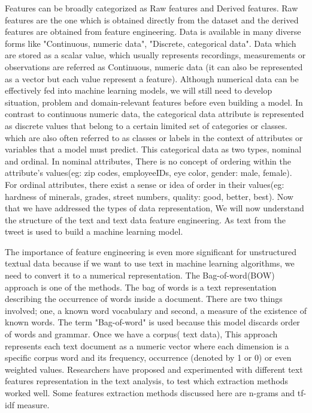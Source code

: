 Features can be broadly categorized as Raw features and Derived features. Raw features are the one which is obtained directly from the dataset and the derived features are obtained from feature engineering. Data is available in many diverse forms like "Continuous, numeric data", "Discrete, categorical data". Data which are stored as a scalar value, which usually represents recordings, measurements or observations are referred as Continuous, numeric data (it can also be represented as a vector but each value represent a feature). Although numerical data can be effectively fed into machine learning models, we will still need to develop situation, problem and domain-relevant features before even building a model. In contrast to continuous numeric data, the categorical data attribute is represented as discrete values that belong to a certain limited set of categories or classes. which are also often referred to as classes or labels in the context of attributes or variables that a model must predict. This categorical data as two types, nominal and ordinal. In nominal attributes, There is no concept of ordering within the attribute's values(eg: zip codes, employeeIDs, eye color, gender: {male, female}). For ordinal attributes, there exist a sense or idea of order in their values(eg: hardness of minerals, grades, street numbers, quality: {good, better,
best}). Now that we have addressed the types of data representation, 
We will now understand the structure of the text and text data feature engineering. As text from the tweet is used to build a machine learning model. 

The importance of feature engineering is even more significant for unstructured textual data because if we want to use text in machine learning algorithms, we need to convert it to a numerical representation. The Bag-of-word(BOW) approach is one of the methods. The bag of words is a text representation describing the occurrence of words inside a document. There are two things involved; one, a known word vocabulary and second, a measure of the existence of known words. The term "Bag-of-word" is used because this model discards order of words and grammar.  Once we have a corpus( text data), This approach represents each text document as a numeric vector where each dimension is a specific corpus word and its frequency, occurrence (denoted by 1 or 0) or even weighted values. Researchers have proposed and experimented with different text features representation in the text analysis, to test which extraction methods worked well. Some features extraction methods discussed here are n-grams and tf-idf measure.


